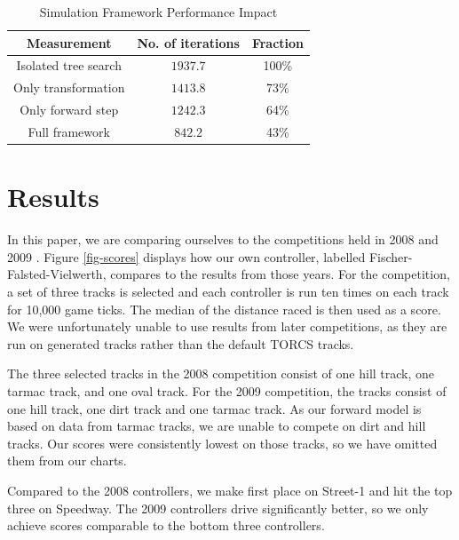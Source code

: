 \documentclass[conference]{IEEEtran}
\begin{document}
\begin{table}
\begin{center}
\renewcommand{\arraystretch}{1.3}
\caption{Simulation Framework Performance Impact}
\label{tab-performance}
\begin{tabular}{|c|c|c|} \hline
\textbf{Measurement} & \textbf{No. of iterations} & \textbf{Fraction} \\ \hline
Isolated tree search & $1937.7$ & 100\% \\ \hline
Only transformation & $1413.8$ & 73\% \\ \hline
Only forward step & $1242.3$ & 64\% \\ \hline
Full framework & $842.2$ & 43\% \\ \hline
\end{tabular}
\end{center}
\end{table}

\section{Results}
\label{sec-results}

In this paper, we are comparing ourselves to the competitions held in 2008 \cite{2008championship} and 2009 \cite{2009championship}. Figure \ref{fig-scores} displays how our own controller, labelled Fischer-Falsted-Vielwerth, compares to the results from those years. For the competition, a set of three tracks is selected and each controller is run ten times on each track for 10,000 game ticks. The median of the distance raced is then used as a score. We were unfortunately unable to use results from later competitions, as they are run on generated tracks rather than the default TORCS tracks.

The three selected tracks in the 2008 competition consist of one hill track, one tarmac track, and one oval track. For the 2009 competition, the tracks consist of one hill track, one dirt track and one tarmac track. As our forward model is based on data from tarmac tracks, we are unable to compete on dirt and hill tracks. Our scores were consistently lowest on those tracks, so we have omitted them from our charts.

Compared to the 2008 controllers, we make first place on Street-1 and hit the top three on Speedway. The 2009 controllers drive significantly better, so we only achieve scores comparable to the bottom three controllers.
\end{document}
